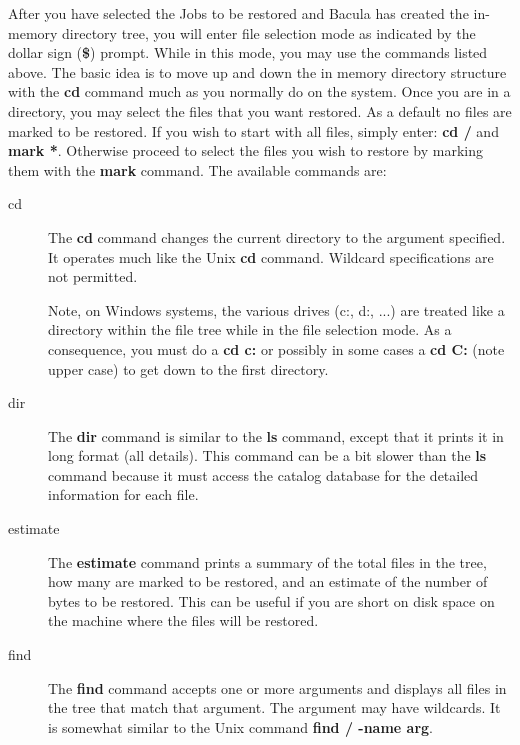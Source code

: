 After you have selected the Jobs to be restored and Bacula has created the
in-memory directory tree, you will enter file selection mode as indicated by
the dollar sign ({\bf \$}) prompt. While in this mode, you may use the
commands listed above. The basic idea is to move up and down the in memory
directory structure with the {\bf cd} command much as you normally do on the
system. Once you are in a directory, you may select the files that you want
restored. As a default no files are marked to be restored. If you wish to
start with all files, simply enter: {\bf cd /} and {\bf mark *}. Otherwise
proceed to select the files you wish to restore by marking them with the {\bf
mark} command. The available commands are: 

\begin{description}

\item [cd]
   The {\bf cd} command changes the current directory to  the argument
   specified.
   It operates much like the Unix {\bf cd} command.  Wildcard specifications are
   not permitted.  

   Note, on Windows systems, the various drives (c:, d:, ...) are treated  like
   a
   directory within the file tree while in the file  selection mode. As a
   consequence, you must do a {\bf cd c:} or  possibly in some cases a {\bf cd
   C:} (note upper case)  to get down to the first directory.  

\item [dir]
   The {\bf dir} command is similar to the {\bf ls} command,  except that it
   prints it in long format (all details). This command  can be a bit slower
   than
   the {\bf ls} command because it must access  the catalog database for the
   detailed information for each file.  

\item [estimate]
   The {\bf estimate} command prints a summary of  the total files in the tree,
   how many are marked to be restored, and  an estimate of the number of bytes
   to
   be restored. This can be useful  if you are short on disk space on the
   machine
   where the files will be  restored.  

\item [find]
   The {\bf find} command accepts one or more arguments  and displays all files
   in the tree that match that argument. The argument  may have wildcards. It is
   somewhat similar to the Unix command  {\bf find / -name arg}.  


\end{description}
